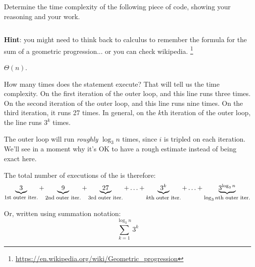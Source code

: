 \begin{prob}
    Determine the time complexity of the following piece of code, showing your reasoning
    and your work.

    \inputminted{python}{\thisdir/include/code.py}

    \textbf{Hint}: you might need to think back to calculus to remember the formula for
    the sum of a geometric progression... or you can check wikipedia.%
    \footnote{\url{https://en.wikipedia.org/wiki/Geometric_progression}}

    \begin{soln}
        $\Theta(n)$.

        How many times does the  statement execute? That will tell us the time complexity.
        On the first iteration
        of the outer loop,  and this line runs three times. On the second iteration
        of the outer loop,  and this line runs nine times. On the third
        iteration, it runs 27 times. In general, on the $k$th iteration of the outer loop,
        the line runs $3^k$ times.

        The outer loop will run \emph{roughly} $\log_3 n$ times, since $i$ is tripled on
        each iteration. We'll see in a moment why it's OK to have a rough
        estimate instead of being exact here.

        The total number of executions of the  is therefore:
        \[
            \underbrace{3}_{\text{\footnotesize 1st outer iter.}}
            +
            \underbrace{9}_{\text{\footnotesize 2nd outer iter.}}
            +
            \underbrace{27}_{\text{\footnotesize 3rd outer iter.}}
            +
            \ldots
            +
            \underbrace{3^k}_{\text{\footnotesize $k$th outer iter.}}
            +
            \ldots
            +
            \underbrace{3^{\log_3 n}}_{\text{\footnotesize $\log_3 n$th outer iter.}}
        \]

        Or, written using summation notation:
        \[
            \sum_{k=1}^{\log_3 n} 3^k
        \]


\end{soln}
\end{prob}
